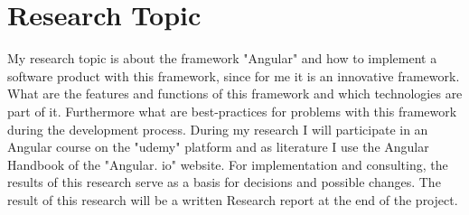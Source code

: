 \section{Research Topic}
\label{sec:research}
My research topic is about the framework "Angular" and how to implement a software product with this framework, since for me it is an innovative framework. What are the features and functions of this framework and which technologies are part of it. Furthermore what are best-practices for problems with this framework during the development process. During my research I will participate in an Angular course on the "udemy" platform and as literature I use the Angular Handbook of the "Angular. io" website. For implementation and consulting, the results of this research serve as a basis for decisions and possible changes. The result of this research will be a written Research report at the end of the project.